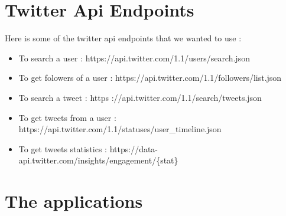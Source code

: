 \documentclass{article}
\begin{document}
\section{Twitter Api Endpoints}
Here is some of the twitter api endpoints that we wanted to use :
\begin{itemize}
    \item To search a user : https://api.twitter.com/1.1/users/search.json
    \item To get folowers of a user : https://api.twitter.com/1.1/followers/list.json
    \item To search a tweet : https ://api.twitter.com/1.1/search/tweets.json
    \item To get tweets from a user : https://api.twitter.com/1.1/statuses/user\_timeline.json 
    \item To get tweets statistics : https://data-api.twitter.com/insights/engagement/\{stat\} 
\end{itemize}


\section{The applications}
\end{document}
